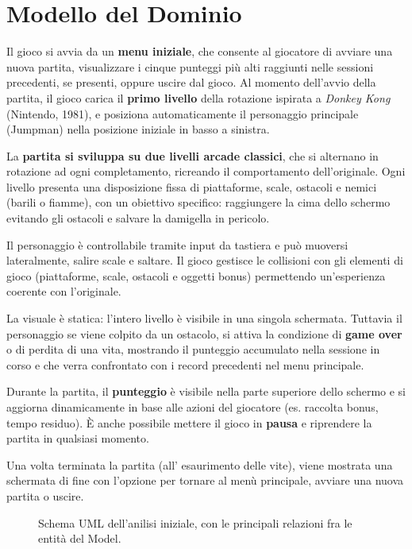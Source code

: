 \documentclass[a4paper,12pt]{report}
\begin{document}
\newpage
\section{Modello del Dominio}

Il gioco si avvia da un \textbf{menu iniziale}, che consente al giocatore di avviare una nuova partita, visualizzare i cinque punteggi più alti raggiunti nelle sessioni
precedenti, se presenti, oppure uscire dal gioco. Al momento dell'avvio della partita, il gioco carica il \textbf{primo livello} della rotazione ispirata a \textit{Donkey Kong} (Nintendo, 1981), e
posiziona automaticamente il personaggio principale (Jumpman) nella posizione iniziale in basso a sinistra.

La \textbf{partita si sviluppa su due livelli arcade classici}, che si alternano in rotazione ad ogni completamento, ricreando il comportamento dell'originale. Ogni livello
presenta una disposizione fissa di piattaforme, scale, ostacoli e nemici (barili o fiamme), con un obiettivo specifico: raggiungere la cima dello schermo evitando gli ostacoli e
salvare la damigella in pericolo.

Il personaggio è controllabile tramite input da tastiera e può muoversi lateralmente, salire scale e saltare. Il gioco gestisce le collisioni con gli elementi di
gioco (piattaforme, scale, ostacoli e oggetti bonus) permettendo un'esperienza coerente con l'originale.

La visuale è statica: l'intero livello è visibile in una singola schermata. Tuttavia il personaggio se viene colpito da un ostacolo, si attiva la condizione
di \textbf{game over} o di perdita di una vita, mostrando il punteggio accumulato nella sessione in corso e che verra confrontato con i record precedenti nel menu principale.

Durante la partita, il \textbf{punteggio} è visibile nella parte superiore dello schermo e si aggiorna dinamicamente in base alle azioni
del giocatore (es. raccolta bonus, tempo residuo). È anche possibile mettere il gioco in \textbf{pausa} e riprendere la partita in qualsiasi momento.

Una volta terminata la partita (all' esaurimento delle vite), viene mostrata una schermata di fine con l'opzione per
tornare al menù principale, avviare una nuova partita o uscire.

\begin{figure}[H]
	\centering{}
	
	\caption{Schema UML dell'anilisi iniziale, con le principali relazioni fra le entità del Model.}
	\label{img:model}
\end{figure}
\end{document}
